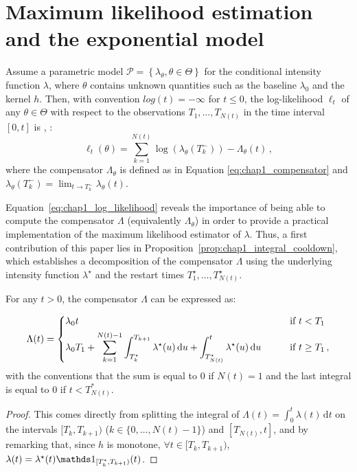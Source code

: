 \section{Maximum likelihood estimation and the exponential model}
\label{sec:chap1_mle}

Assume a parametric model $\mathcal P = \left\{ \lambda_\theta, \theta \in \Theta \right\}$ for the conditional intensity function $\lambda$, where $\theta$ contains unknown quantities such as the baseline $\lambda_0$ and the kernel $h$.
Then, with convention $log(t) = -\infty$ for $t\leq0$, the log-likelihood $\ell_t$ of any $\theta \in \Theta$ with respect to the observations $T_1,\ldots, T_{N(t)}$ in the time interval $[0,t]$ is \parencite[Proposition 7.2.III.]{DaleyV1}, \parencite{Ozaki1979}:
\begin{equation}\label{eq:chap1_log_likelihood}
    \ell_t(\theta) = \sum_{k=1}^{N(t)}{\log{(\lambda_\theta(T_k^-))}} - \Lambda_\theta(t)\,,
\end{equation}
where the compensator $\Lambda_\theta$ is defined as in Equation \eqref{eq:chap1_compensator} and $\lambda_\theta(T_k^-) = \lim_{t \to T_k^-} \lambda_\theta(t)$.

Equation~\eqref{eq:chap1_log_likelihood} reveals the importance of being able to compute the compensator $\Lambda$ (equivalently $\Lambda_\theta$) in order to provide a practical implementation of the maximum likelihood estimator of $\lambda$.
Thus, a first contribution of this paper lies in Proposition~\ref{prop:chap1_integral_cooldown}, which establishes a decomposition of the compensator $\Lambda$ using the underlying intensity function $\lambda^\star$ and the restart times $T_{1}^\star,\ldots, T_{N(t)}^\star$.

\begin{proposition}\label{prop:chap1_integral_cooldown}
For any $t>0$, the compensator $\Lambda$ can be expressed as:

\begin{equation}\label{eq:chap1_compensator_general}
\Lambda(t) =
\begin{dcases}
    \lambda_0 t &\text{\qquad if $t<T_1$}\\
    \lambda_0 T_1 + \sum_{k=1}^{{N(t)-1}}{\int_{T_{k}^\star}^{T_{k+1}}{\lambda^\star(u)\,\mathrm{d}u}} + \int_{T_{N(t)}^\star}^{t}{\lambda^\star(u)\,\mathrm{d}u} &\text{\qquad if $t\geq T_1$}\,,
\end{dcases}
\end{equation}
with the conventions that the sum is equal to $0$ if ${N(t)} = 1$ and the last integral is equal to $0$ if $t < T_{N(t)}^*$.
\end{proposition}
\begin{proof}
This comes directly from splitting the integral of $\Lambda(t) = \int_{0}^{t}{\lambda(t)\,\mathrm{d}t}$ on the intervals $[T_k, T_{k+1})$ ($k \in \{ 0, \dots, N(t)-1 \}$) and $[T_{N(t)}, t]$, and by remarking that, since $h$ is monotone, $\forall t\in[T_k, T_{k+1})$, $\lambda(t) = \lambda^\star(t)\II_{[T_k^*,T_{k+1})}(t)$.

\end{proof}

